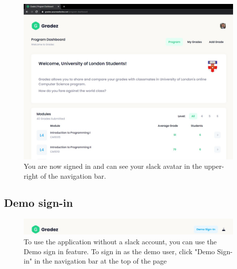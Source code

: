\begin{figure}[H]
    \centering
    \includegraphics[width=15cm]{images/user-guide/slack-sign-in/5.jpg}
    \caption{You are now signed in and can see your slack avatar in the upper-right of the navigation bar.}
    \label{fig:slacksignin5}
\end{figure}

\subsection{Demo sign-in}\label{sec:demosignin}
\begin{figure}[H]
    \centering
    \includegraphics[width=15cm]{images/user-guide/demo-sign-in/1.jpg}
    \caption{To use the application without a slack account, you can use the Demo sign in feature. To sign in as the demo user, click "Demo Sign-in" in the navigation bar at the top of the page}
    \label{fig:demosignin1}
\end{figure}


